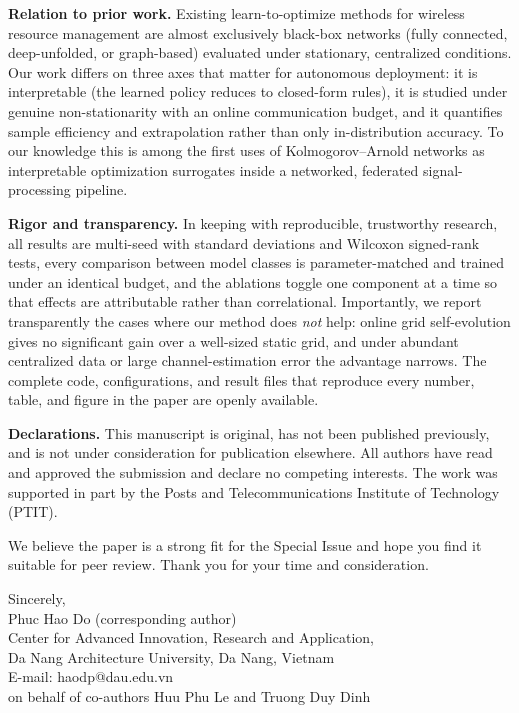 \documentclass[11pt]{article}
\begin{document}
\textbf{Relation to prior work.} Existing learn-to-optimize methods for wireless
resource management are almost exclusively black-box networks (fully connected,
deep-unfolded, or graph-based) evaluated under stationary, centralized conditions.
Our work differs on three axes that matter for autonomous deployment: it is
interpretable (the learned policy reduces to closed-form rules), it is studied
under genuine non-stationarity with an online communication budget, and it
quantifies sample efficiency and extrapolation rather than only in-distribution
accuracy. To our knowledge this is among the first uses of Kolmogorov--Arnold
networks as interpretable optimization surrogates inside a networked, federated
signal-processing pipeline.

\textbf{Rigor and transparency.} In keeping with reproducible, trustworthy
research, all results are multi-seed with standard deviations and Wilcoxon
signed-rank tests, every comparison between model classes is parameter-matched and
trained under an identical budget, and the ablations toggle one component at a time
so that effects are attributable rather than correlational. Importantly, we report
transparently the cases where our method does \emph{not} help: online grid
self-evolution gives no significant gain over a well-sized static grid, and under
abundant centralized data or large channel-estimation error the advantage narrows.
The complete code, configurations, and result files that reproduce every number,
table, and figure in the paper are openly available.

\textbf{Declarations.} This manuscript is original, has not been published
previously, and is not under consideration for publication elsewhere. All authors
have read and approved the submission and declare no competing interests. The work
was supported in part by the Posts and Telecommunications Institute of Technology
(PTIT).

We believe the paper is a strong fit for the Special Issue and hope you find it
suitable for peer review. Thank you for your time and consideration.

\vspace{8pt}
\noindent Sincerely,\\[4pt]
\noindent Phuc Hao Do (corresponding author)\\
\noindent Center for Advanced Innovation, Research and Application,\\
\noindent Da Nang Architecture University, Da Nang, Vietnam\\
\noindent E-mail: haodp@dau.edu.vn\\[4pt]
\noindent on behalf of co-authors Huu Phu Le and Truong Duy Dinh
\end{document}
